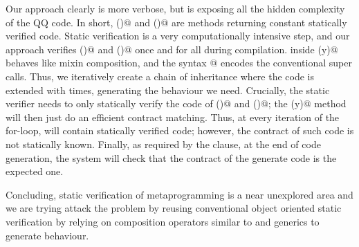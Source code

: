 \documentclass[a4paper,twoside,british,9pt]{extarticle}
\begin{document}
\vspace{-2ex}
Our approach clearly is more verbose, but is exposing all the hidden complexity
of the QQ code.
In short, \Q@base()@ and \Q@inductive()@ 
are methods returning constant statically verified code. 
Static verification is a very computationally intensive step, and our approach verifies
\Q@base()@ and \Q@inductive()@ once and for all during compilation.
\Q@Override@ inside \Q@generate(y)@ behaves like mixin composition,
and the syntax @ encodes the
conventional super calls.
Thus, we iteratively create a chain of inheritance where
the \Q@base@ code is extended with \Q@inductive@ \Q@y@
times, generating the behaviour we need.
Crucially, the static verifier needs to only statically verify the
code of \Q@base()@ and \Q@inductive()@;
the \Q@generate(y)@ method will then just do
an efficient contract matching.
Thus, at every iteration of the for-loop, \Q@res@
will contain statically verified code; however, the contract of such code is not statically known.
Finally, as required by the \Q@ensuresRV@ clause, at the end of code generation, the system will
check that the contract of the generate code is the expected one.

Concluding, static verification of metaprogramming is a
near unexplored area and we are trying attack the problem by reusing conventional
object oriented static verification by
relying on
composition operators similar to \Q@extends@ and generics to
generate behaviour.
\vspace{-3ex}

{\tiny }
\end{document}
